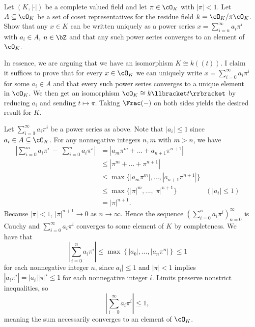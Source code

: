 \begin{prop}\label{prop:power-series-rep-p-adic}
	
Let $(K, |\cdot |)$ be a complete valued field and let $\pi \in \cO_K$ with $|\pi| < 1$. Let $A \subseteq \cO_K$ be a set of coset representatives for the residue field $k = \cO_K/\pi\cO_K$. Show that any $x \in K$ can be written uniquely as a power series $x = \sum^\infty_{i=n} a_i\pi^i$ with $a_i \in A$, $n \in \bZ$ and that any such power series converges to an element of $\cO_K$.
\end{prop}
\begin{prf}
	In essence, we are arguing that we have an isomorphism $K \cong k(\!(t)\!)$. I claim it suffices to prove that for every $x \in \cO_K $ we can uniquely write $x = \sum_{i=0}^\infty a_i \pi^i$ for some $a_i \in A$ and that every such power series converges to a unique element in $\cO_K$. We then get an isomorphism $\cO_K \cong k\llbracket t\rrbracket$ by reducing $a_i$ and sending $t \mapsto \pi$. Taking $\Frac(-)$ on both sides yields the desired result for $K$.

	Let $\sum_{i=0}^\infty a_i \pi^i$ be a power series as above. Note that $|a_i| \leq 1$ since $a_i \in A \subseteq \cO_K$. For any nonnegative integers $n,m$ with $m > n$, we have
	\begin{align*}
		\left|\sum_{i=0}^m a_i\pi^i ~ - ~ \sum_{i=0}^n a_i \pi^i\right| 
		&= \left|a_m \pi^m + \dots + a_{n+1}\pi^{n+1}\right| & \\
		&\leq \left|\pi^m + ... + \pi^{n+1}\right| & \\
		&\leq \max\{|a_m\pi^m|,...,|a_{n+1}\pi^{n+1}|\} & \\
		&\leq \max\{|\pi|^m,...,|\pi|^{n+1}\} & (\text{$|a_i| \leq 1$}) \\
		&= |\pi|^{n+1}.
	\end{align*}
	Because $|\pi| < 1$, $|\pi|^{n+1} \to 0$ as $n \to \infty$. Hence the sequence $\left(\sum_{i=0}^n a_i \pi^i\right)_{n=0}^\infty$ is Cauchy and $\sum_{i=0}^\infty a_i \pi^i$ converges to some element of $K$ by completeness. We have that 
	\begin{equation*}
		\left|\sum_{i=0}^n a_i \pi^i\right| \leq \max \left\{|a_0|, ..., |a_n\pi^n|\right\} \leq 1
	\end{equation*}
	for each nonnegative integer $n$, since $a_i| \leq 1$ and $|\pi| < 1$ implies $|a_i \pi^i| = |a_i||\pi|^i \leq 1$ for each nonnegative integer $i$. Limits preserve nonstrict inequalities, so
	\begin{equation*}
		\left|\sum_{i=0}^\infty a_i \pi^i\right| \leq 1,
	\end{equation*}
	meaning the sum necessarily converges to an element of $\cO_K$.
	

\end{prf}
